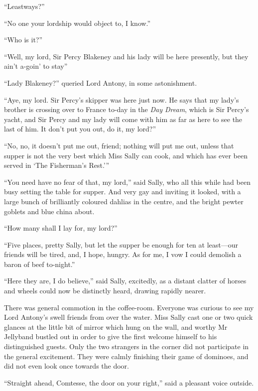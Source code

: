 \enquote{Leastways?}

\enquote{No one your lordship would object to, I know.}

\enquote{Who is it?}

\enquote{Well, my lord, Sir Percy Blakeney and his lady will be here presently, but they ain't a-goin’ to stay\longdash}

\enquote{Lady Blakeney?} queried Lord Antony, in some astonishment.

\enquote{Aye, my lord. Sir Percy's skipper was here just now. He says that my lady's brother is crossing over to France to-day in the \textit{Day Dream}, which is Sir Percy's yacht, and Sir Percy and my lady will come with him as far as here to see the last of him. It don't put you out, do it, my lord?}

\enquote{No, no, it doesn't put me out, friend; nothing will put me out, unless that supper is not the very best which Miss Sally can cook, and which has ever been served in \enquote{The Fisherman's Rest.}}

\enquote{You need have no fear of that, my lord,} said Sally, who all this while had been busy setting the table for supper. And very gay and inviting it looked, with a large bunch of brilliantly coloured dahlias in the centre, and the bright pewter goblets and blue china about.

\enquote{How many shall I lay for, my lord?}

\enquote{Five places, pretty Sally, but let the supper be enough for ten at least---our friends will be tired, and, I hope, hungry. As for me, I vow I could demolish a baron of beef to-night.}

\enquote{Here they are, I do believe,} said Sally, excitedly, as a distant clatter of horses and wheels could now be distinctly heard, drawing rapidly nearer.

There was general commotion in the coffee-room. Everyone was curious to see my Lord Antony's swell friends from over the water. Miss Sally cast one or two quick glances at the little bit of mirror which hung on the wall, and worthy Mr Jellyband bustled out in order to give the first welcome himself to his distinguished guests. Only the two strangers in the corner did not participate in the general excitement. They were calmly finishing their game of dominoes, and did not even look once towards the door.

\enquote{Straight ahead, Comtesse, the door on your right,} said a pleasant voice outside.

